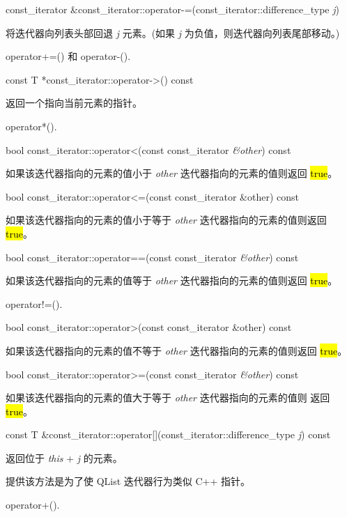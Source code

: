 const\_iterator \&const\_iterator::operator-=(const\_iterator::difference\_type \emph{j})

将迭代器向列表头部回退 \emph{j} 元素。(如果 \emph{j} 为负值，则迭代器向列表尾部移动。)

\begin{notice}[另请参见]
operator+=() 和 operator-().
\end{notice}


const T *const\_iterator::operator->() const

返回一个指向当前元素的指针。

\begin{notice}[另请参见]
operator*().
\end{notice}


bool const\_iterator::operator<(const const\_iterator \emph{\&other}) const

如果该迭代器指向的元素的值小于 \emph{other} 迭代器指向的元素的值则返回 \hl{true}。

bool const\_iterator::operator<=(const const\_iterator \&other) const

如果该迭代器指向的元素的值小于等于 \emph{other} 迭代器指向的元素的值则返回
\hl{true}。

bool const\_iterator::operator==(const const\_iterator \emph{\&other}) const

如果该迭代器指向的元素的值等于 \emph{other} 迭代器指向的元素的值则返回 \hl{true}。

\begin{notice}[另请参见]
operator!=().
\end{notice}

bool const\_iterator::operator>(const const\_iterator \&other) const

如果该迭代器指向的元素的值不等于 \emph{other} 迭代器指向的元素的值则返回 \hl{true}。

bool const\_iterator::operator>=(const const\_iterator \emph{\&other}) const

如果该迭代器指向的元素的值大于等于 \emph{other} 迭代器指向的元素的值则
返回 \hl{true}。

const T \&const\_iterator::operator[](const\_iterator::difference\_type \emph{j}) const

返回位于 \emph{this} + \emph{j} 的元素。

提供该方法是为了使 QList 迭代器行为类似 C++ 指针。

\begin{notice}[另请参见]
operator+().
\end{notice}



